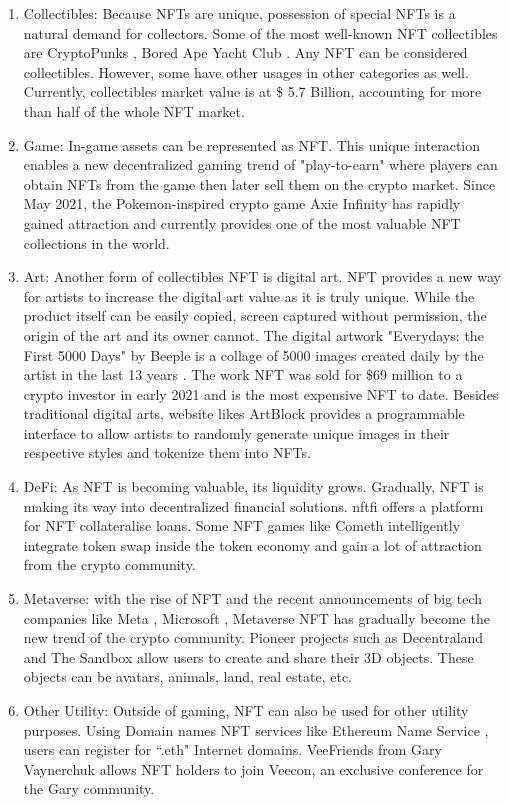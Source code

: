 \documentclass[12pt]{article}
\begin{document}
\begin{enumerate}
\item Collectibles: Because NFTs are unique, possession of special NFTs is a natural demand for collectors. Some of the most well-known NFT collectibles are CryptoPunks \cite{cryptopunks}, Bored Ape Yacht Club \cite{bayc}. Any NFT can be considered collectibles. However, some have other usages in other categories as well. Currently, collectibles market value is at \$ 5.7 Billion, accounting for more than half of the whole NFT market.
\item Game: In-game assets can be represented as NFT. This unique interaction enables a new decentralized gaming trend of "play-to-earn" where players can obtain NFTs from the game then later sell them on the crypto market. Since May 2021, the Pokemon-inspired crypto game Axie Infinity \cite{axie} has rapidly gained attraction and currently provides one of the most valuable NFT collections in the world.
\item Art: Another form of collectibles NFT is digital art. NFT provides a new way for artists to increase the digital art value as it is truly unique. While the product itself can be easily copied, screen captured without permission, the origin of the art and its owner cannot. The digital artwork "Everydays: the First 5000 Days" by Beeple is a collage of 5000 images created daily by the artist in the last 13 years \cite{beeple}. The work NFT was sold for \$69 million to a crypto investor in early 2021 and is the most expensive NFT to date. Besides traditional digital arts, website likes ArtBlock \cite{artblock} provides a programmable interface to allow artists to randomly generate unique images in their respective styles and tokenize them into NFTs. 
\item DeFi: As NFT is becoming valuable, its liquidity grows. Gradually, NFT is making its way into decentralized financial solutions. nftfi \cite {nftfi} offers a platform for NFT collateralise loans. Some NFT games like Cometh \cite{cometh} intelligently integrate token swap inside the token economy and gain a lot of attraction from the crypto community.  
\item Metaverse: with the rise of NFT and the recent announcements of big tech companies like Meta \cite{facebook}, Microsoft \cite{microsoft}, Metaverse NFT has gradually become the new trend of the crypto community. Pioneer projects such as Decentraland \cite{decentraland} and The Sandbox \cite{sandbox} allow users to create and share their 3D objects. These objects can be avatars, animals, land, real estate, etc. 
\item Other Utility: Outside of gaming, NFT can also be used for other utility purposes. Using Domain names NFT services like Ethereum Name Service \cite{ens}, users can register for ``.eth" Internet domains. VeeFriends \cite{vee} from Gary Vaynerchuk allows NFT holders to join Veecon, an exclusive conference for the Gary community.
\end{enumerate}
\end{document}
